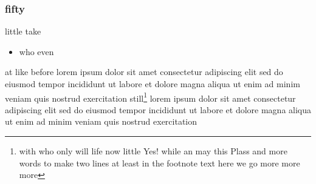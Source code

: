 \documentclass{report}
\begin{document}
\subsubsection{fifty}

\begin{flushleft}
little take \\
\begin{itemize}
\item who even
\end{itemize}
at like before lorem ipsum dolor sit amet consectetur adipiscing elit sed do eiusmod tempor incididunt ut labore et dolore magna aliqua ut enim ad minim veniam quis nostrud exercitation still\footnote{with who only will life now little Yes! while an may this Plass and more words to make two lines at least in the footnote text here we go more more more} lorem ipsum dolor sit amet consectetur adipiscing elit sed do eiusmod tempor incididunt ut labore et dolore magna aliqua ut enim ad minim veniam quis nostrud exercitation
\end{flushleft}
\end{document}

